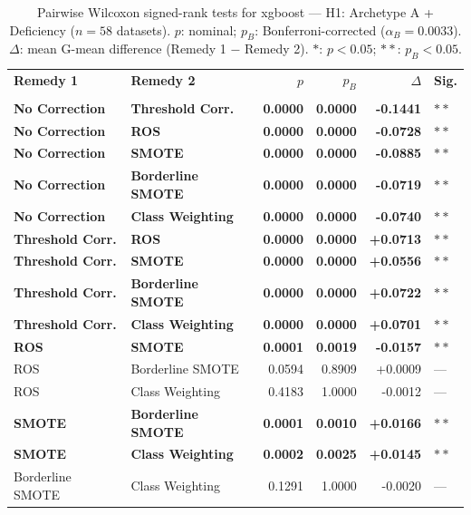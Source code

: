 \begin{table}[ht]
\centering
\scriptsize
\caption{Pairwise Wilcoxon signed-rank tests for xgboost --- H1: Archetype A + Deficiency ($n=58$ datasets). $p$: nominal; $p_B$: Bonferroni-corrected ($\alpha_B=0.0033$). $\Delta$: mean G-mean difference (Remedy 1 $-$ Remedy 2). $\ast$: $p<0.05$; $\ast\ast$: $p_B<0.05$.}
\label{tab:wilcoxon_xgboost_h1}
\begin{tabular}{llrrrl}
\toprule
\textbf{Remedy 1} & \textbf{Remedy 2} & \textbf{$p$} & \textbf{$p_B$} & \textbf{$\Delta$} &  \textbf{Sig.} \\\\
\midrule
    \textbf{No Correction} & \textbf{Threshold Corr.} & \textbf{0.0000} & \textbf{0.0000} & \textbf{-0.1441} & $\ast\ast$ \\
    \textbf{No Correction} & \textbf{ROS} & \textbf{0.0000} & \textbf{0.0000} & \textbf{-0.0728} & $\ast\ast$ \\
    \textbf{No Correction} & \textbf{SMOTE} & \textbf{0.0000} & \textbf{0.0000} & \textbf{-0.0885} & $\ast\ast$ \\
    \textbf{No Correction} & \textbf{Borderline SMOTE} & \textbf{0.0000} & \textbf{0.0000} & \textbf{-0.0719} & $\ast\ast$ \\
    \textbf{No Correction} & \textbf{Class Weighting} & \textbf{0.0000} & \textbf{0.0000} & \textbf{-0.0740} & $\ast\ast$ \\
    \textbf{Threshold Corr.} & \textbf{ROS} & \textbf{0.0000} & \textbf{0.0000} & \textbf{+0.0713} & $\ast\ast$ \\
    \textbf{Threshold Corr.} & \textbf{SMOTE} & \textbf{0.0000} & \textbf{0.0000} & \textbf{+0.0556} & $\ast\ast$ \\
    \textbf{Threshold Corr.} & \textbf{Borderline SMOTE} & \textbf{0.0000} & \textbf{0.0000} & \textbf{+0.0722} & $\ast\ast$ \\
    \textbf{Threshold Corr.} & \textbf{Class Weighting} & \textbf{0.0000} & \textbf{0.0000} & \textbf{+0.0701} & $\ast\ast$ \\
    \textbf{ROS} & \textbf{SMOTE} & \textbf{0.0001} & \textbf{0.0019} & \textbf{-0.0157} & $\ast\ast$ \\
    ROS & Borderline SMOTE & 0.0594 & 0.8909 & +0.0009 & --- \\
    ROS & Class Weighting & 0.4183 & 1.0000 & -0.0012 & --- \\
    \textbf{SMOTE} & \textbf{Borderline SMOTE} & \textbf{0.0001} & \textbf{0.0010} & \textbf{+0.0166} & $\ast\ast$ \\
    \textbf{SMOTE} & \textbf{Class Weighting} & \textbf{0.0002} & \textbf{0.0025} & \textbf{+0.0145} & $\ast\ast$ \\
    Borderline SMOTE & Class Weighting & 0.1291 & 1.0000 & -0.0020 & --- \\
\bottomrule
\end{tabular}
\end{table}
